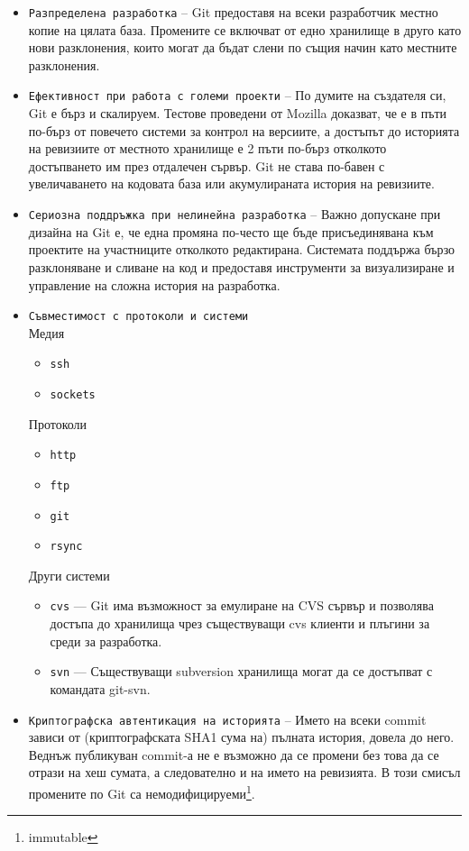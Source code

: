 \documentclass[a4paper]{article}
\begin{document}
    \begin{itemize}
      \item \texttt{Разпределена разработка} -- Git предоставя на всеки разработчик местно копие на цялата база. Промените се включват от едно хранилище в друго като нови разклонения, които могат да бъдат слени по същия начин като местните разклонения.
      \item \texttt{Ефективност при работа с големи проекти} -- По думите на създателя си, Git е бърз и скалируем. Тестове проведени от Mozilla доказват, че е в пъти по-бърз от повечето системи за контрол на версиите, а достъпът до историята на ревизиите от местното хранилище е 2 пъти по-бърз отколкото достъпването им през отдалечен сървър. Git не става по-бавен с увеличаването на кодовата база или акумулираната история на ревизиите.
      \item \texttt{Сериозна поддръжка при нелинейна разработка} -- Важно допускане при дизайна на Git е, че една промяна по-често ще бъде присъединявана към проектите на участниците отколкото редактирана. Системата поддържа бързо разклоняване и сливане на код и предоставя инструменти за визуализиране и управление на сложна история на разработка.
      \item \texttt{Съвместимост с протоколи и системи} \\
        Медия
        \begin{itemize}
          \item \texttt{ssh}
          \item \texttt{sockets}
        \end{itemize}
        Протоколи
        \begin{itemize}
          \item \texttt{http}
          \item \texttt{ftp}
          \item \texttt{git}
          \item \texttt{rsync}
        \end{itemize}
        Други системи
        \begin{itemize}
          \item \texttt{cvs} --- Git има възможност за емулиране на CVS сървър и позволява достъпа до хранилища чрез съществуващи cvs клиенти и плъгини за среди за разработка.
          \item \texttt{svn} --- Съществуващи subversion хранилища могат да се достъпват с командата git-svn.
        \end{itemize}
      \item \texttt{Криптографска автентикация на историята} -- Името на всеки commit зависи от (криптографската SHA1 сума на) пълната история, довела до него. Веднъж публикуван commit-а не е възможно да се промени без това да се отрази на хеш сумата, а следователно и на името на ревизията. В този смисъл промените по Git са немодифицируеми\footnote{immutable}.

\end{itemize}
\end{document}
